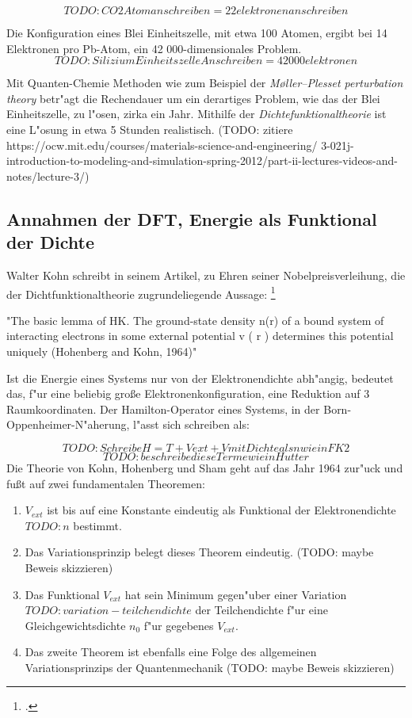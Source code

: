 $$TODO: CO2 Atom anschreiben = 22elektronen anschreiben$$

Die Konfiguration eines Blei Einheitszelle, mit etwa 100 Atomen, ergibt bei 14 Elektronen pro Pb-Atom, ein 42 000-dimensionales Problem. 
$$TODO: Silizium Einheitszelle Anschreiben = 42 000 elektronen$$

Mit Quanten-Chemie Methoden wie zum Beispiel der \textit{Møller–Plesset perturbation theory} betr"agt die Rechendauer um 
ein derartiges Problem, wie das der Blei Einheitszelle, zu l"osen, zirka ein Jahr. Mithilfe der \textit{Dichtefunktionaltheorie} ist 
eine L"osung in etwa 5 Stunden realistisch. (TODO: zitiere https://ocw.mit.edu/courses/materials-science-and-engineering/
3-021j-introduction-to-modeling-and-simulation-spring-2012/part-ii-lectures-videos-and-notes/lecture-3/)


\subsection{Annahmen der DFT, Energie als Funktional der Dichte}

Walter Kohn schreibt in seinem Artikel, zu Ehren seiner Nobelpreisverleihung, die der Dichtfunktionaltheorie zugrundeliegende Aussage: \footcite[7]{nobel-kohn}

"The basic lemma of HK. The ground-state density n(r) of a bound system of interacting electrons in some external potential v ( r ) determines this potential uniquely (Hohenberg and Kohn, 1964)"

Ist die Energie eines Systems nur von der Elektronendichte abh"angig, bedeutet das, f"ur eine beliebig große Elektronenkonfiguration, eine Reduktion auf 3 Raumkoordinaten. 
Der Hamilton-Operator eines Systems, in der Born-Oppenheimer-N"aherung, l"asst sich schreiben als: 

$$TODO: Schreibe H=T+Vext+V mit Dichte als n wie in FK2$$
$$TODO: beschreibe diese Terme wie in Hutter$$
Die Theorie von Kohn, Hohenberg und Sham geht auf das Jahr 1964 zur"uck und fußt auf zwei fundamentalen Theoremen: 


\begin{enumerate}
\item $V_{ext} $ ist bis auf eine Konstante eindeutig als Funktional der Elektronendichte $TODO:n$ bestimmt.
\item Das Variationsprinzip belegt dieses Theorem eindeutig. (TODO: maybe Beweis skizzieren)

\item  Das Funktional $V_{ext}$ hat sein Minimum gegen"uber einer Variation $TODO:variation-teilchendichte$ der Teilchendichte f"ur eine Gleichgewichtsdichte $n_0$ f"ur gegebenes $V_{ext} $. 
\item Das zweite Theorem ist ebenfalls eine Folge des allgemeinen Variationsprinzips der Quantenmechanik (TODO: maybe Beweis skizzieren)

\end{enumerate}

